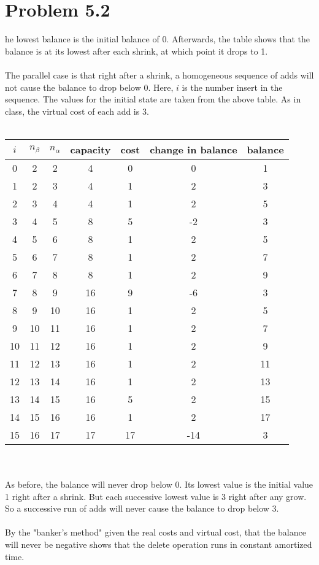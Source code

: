 \documentclass[12pt,letterpaper]{article}
\newcommand\hwnum{5}                  %
\newenvironment{answer}[2]{
  \section*{Problem \hwnum.#1}
}{\newpage}
\begin{document}
\begin{answer}{2}
The lowest balance is the initial balance of 0. Afterwards, the table shows that the balance is at its lowest after each shrink, at which point it drops to 1. \\\\

The parallel case is that right after a shrink, a homogeneous sequence of adds will not cause the balance to drop below 0. Here, $i$ is the number insert in the sequence. The values for the initial state are taken from the above table. As in class, the virtual cost of each add is 3.\\\\

\begin{tabular}{c|c|c|c|c|c|c}
$i$ & $n_\beta$ & $n_\alpha$ & capacity & cost & change in balance & balance \\ \hline
0 & 2 & 2& 4 & 0 & 0 & 1\\
1 & 2 &3& 4 & 1 & 2 & 3\\
2 & 3 &4& 4 & 1 & 2 & 5\\
3 & 4 &5& 8 & 5 & -2 & 3\\
4 & 5 &6& 8 & 1 & 2 & 5\\
5 & 6 &7& 8 & 1 & 2 & 7\\
6 & 7 &8& 8 & 1 & 2 & 9\\
7 & 8 &9& 16 & 9 & -6 & 3\\
8 & 9 &10& 16 & 1 & 2 & 5\\
9 & 10 &11& 16 & 1 & 2 & 7\\
10 & 11 &12& 16 & 1 & 2 & 9\\
11 & 12 &13& 16 & 1 & 2 & 11\\
12 & 13 &14& 16 & 1 & 2 & 13\\
13 & 14 &15& 16 & 5 & 2 & 15\\
14 & 15 &16& 16 & 1 & 2 & 17\\
15 & 16 &17& 17 & 17 & -14 & 3\\
\end{tabular}\\\\

As before, the balance will never drop below 0. Its lowest value is the initial value 1 right after a shrink. But each successive lowest value is 3 right after any grow. So a successive run of adds will never cause the balance to drop below 3.\\\\

By the "banker's method" given the real costs and virtual cost, that the balance will never be negative shows that the delete operation runs in constant amortized time.

\end{answer}
\end{document}
